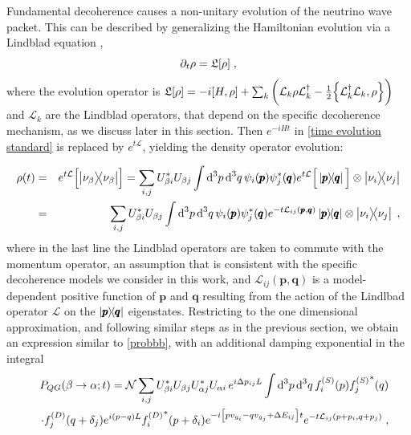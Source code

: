 \documentclass[11pt]{article}
\begin{document}
Fundamental decoherence causes a non-unitary evolution of the neutrino wave packet. This can be described by generalizing the Hamiltonian evolution via a Lindblad equation \cite{Lindblad1976},
\begin{equation}\label{Lindblad}
    \partial_t \rho = \mathfrak{L}\qty[\rho]\;,
\end{equation}
where the evolution operator is $\mathfrak{L}\qty[\rho] = -i [H,\rho] + \sum_k \qty(\mathcal{L}_k\rho \mathcal{L}_k^\dagger -\frac{1}{2}\pb{\mathcal{L}_k^\dagger \mathcal{L}_k}{\rho})$ and $\mathcal{L}_k$ are the Lindblad operators, that depend on the specific decoherence mechanism, as we discuss later in this section. Then $e^{-iHt}$ in \eqref{time evolution standard} is replaced by $e^{t\mathcal{L}}$, yielding the density operator evolution: 

\begin{eqnarray}
    \rho(t) &=& e^{t \mathcal{L}} \qty[\ketbra{\nu_\beta}{\nu_\beta}] = \sum_{i,j} U_{\beta i}^* U_{\beta j} \int \text{d}^3p \,\text{d}^3 q\, \psi_i\qty(\pmb{p})\psi_j^*\qty(\pmb{q}) e^{t\mathcal{L}}\Big[\ketbra{\pmb{p}}{\pmb{q}}\Big]\otimes \ketbra{\nu_i}{\nu_j}\nonumber\\
    &=& \sum_{i,j} U_{\beta i}^* U_{\beta j} \int \text{d}^3p \,\text{d}^3 q\,\psi_i\qty(\pmb{p})\psi_j^*\qty(\pmb{q})e^{-t\mathcal{L}_{ij}(\pmb{p},\pmb{q})} \ketbra{\pmb{p}}{\pmb{q}}\otimes \ketbra{\nu_i}{\nu_j}\;, \label{time evolution decohe}
\end{eqnarray}
where in the last line  the Lindblad operators are taken to commute with the momentum operator, an assumption that is consistent with the specific decoherence models we consider in this work, and $\mathcal{L}_{ij}(\pmb{p},\pmb{q})$ is a model-dependent positive function of $\pmb{p}$ and $\pmb{q}$ resulting from the action of the Lindlbad operator $\mathcal{L}$ on the $\ketbra{\pmb{p}}{\pmb{q}}$ eigenstates. Restricting to the one dimensional approximation, and following similar steps as in the previous section, we obtain an expression similar to \eqref{probbb}, with  an additional damping exponential in the integral
\begin{eqnarray}
    &&P_{QG}(\beta\to\alpha;t) = \mathcal{N}\sum_{i,j} U^*_{\beta i} U_{\beta j} U^*_{\alpha j} U_{\alpha i} \,e^{i\Delta p_{ij}L} \int \text{d}^3p \,\text{d}^3 q\,f_i^{(S)}(p) {f_j^{(S)}}^*(q) \nonumber \\ &&\cdot f_j^{(D)}(q+\delta_j) e^{i(p-q)L} {f_i^{(D)}}^*(p+\delta_i) e^{-i\qty[pv_{g_i}-qv_{g_j}+\Delta E_{ij}]t} e^{-t \mathcal{L}_{ij}(p+p_i,q+p_j)}\;,
\end{eqnarray}
\end{document}
